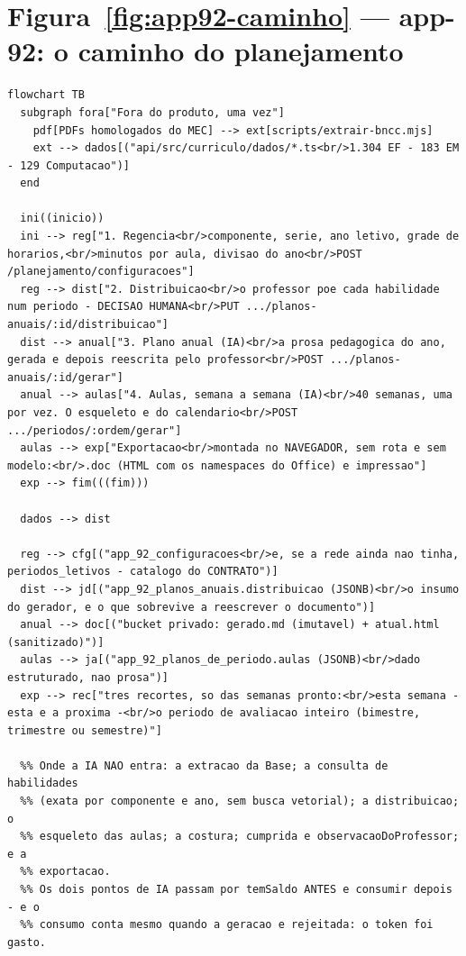 \section{Figura~\ref{fig:app92-caminho} --- app-92: o caminho do planejamento}

\begin{lstlisting}[language=mermaid]
flowchart TB
  subgraph fora["Fora do produto, uma vez"]
    pdf[PDFs homologados do MEC] --> ext[scripts/extrair-bncc.mjs]
    ext --> dados[("api/src/curriculo/dados/*.ts<br/>1.304 EF - 183 EM - 129 Computacao")]
  end

  ini((inicio))
  ini --> reg["1. Regencia<br/>componente, serie, ano letivo, grade de horarios,<br/>minutos por aula, divisao do ano<br/>POST /planejamento/configuracoes"]
  reg --> dist["2. Distribuicao<br/>o professor poe cada habilidade num periodo - DECISAO HUMANA<br/>PUT .../planos-anuais/:id/distribuicao"]
  dist --> anual["3. Plano anual (IA)<br/>a prosa pedagogica do ano, gerada e depois reescrita pelo professor<br/>POST .../planos-anuais/:id/gerar"]
  anual --> aulas["4. Aulas, semana a semana (IA)<br/>40 semanas, uma por vez. O esqueleto e do calendario<br/>POST .../periodos/:ordem/gerar"]
  aulas --> exp["Exportacao<br/>montada no NAVEGADOR, sem rota e sem modelo:<br/>.doc (HTML com os namespaces do Office) e impressao"]
  exp --> fim(((fim)))

  dados --> dist

  reg --> cfg[("app_92_configuracoes<br/>e, se a rede ainda nao tinha, periodos_letivos - catalogo do CONTRATO")]
  dist --> jd[("app_92_planos_anuais.distribuicao (JSONB)<br/>o insumo do gerador, e o que sobrevive a reescrever o documento")]
  anual --> doc[("bucket privado: gerado.md (imutavel) + atual.html (sanitizado)")]
  aulas --> ja[("app_92_planos_de_periodo.aulas (JSONB)<br/>dado estruturado, nao prosa")]
  exp --> rec["tres recortes, so das semanas pronto:<br/>esta semana - esta e a proxima -<br/>o periodo de avaliacao inteiro (bimestre, trimestre ou semestre)"]

  %% Onde a IA NAO entra: a extracao da Base; a consulta de habilidades
  %% (exata por componente e ano, sem busca vetorial); a distribuicao; o
  %% esqueleto das aulas; a costura; cumprida e observacaoDoProfessor; e a
  %% exportacao.
  %% Os dois pontos de IA passam por temSaldo ANTES e consumir depois - e o
  %% consumo conta mesmo quando a geracao e rejeitada: o token foi gasto.
\end{lstlisting}

